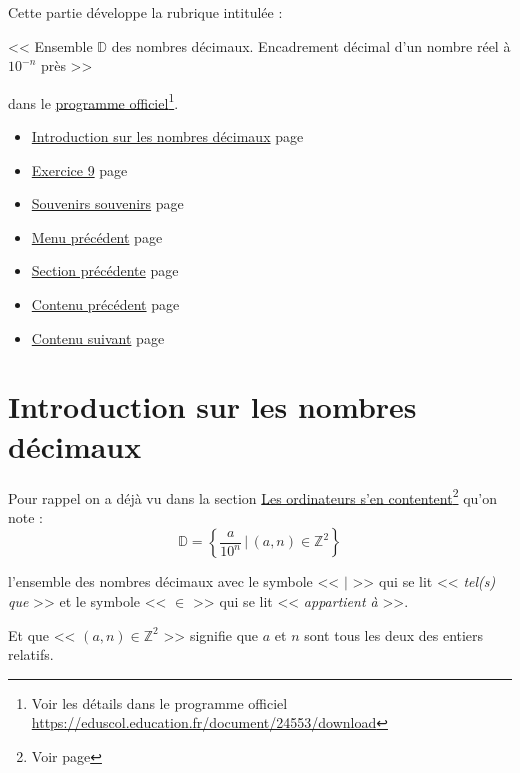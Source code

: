 \documentclass[a4paper,11pt]{book}
\begin{document}
\clearpage

Cette partie développe la rubrique intitulée :

<< Ensemble \(\mathbb{D}\) des nombres décimaux.
Encadrement décimal d'un nombre réel à \(10^{-n}\) près >>

dans le \href{https://eduscol.education.fr/document/24553/download}{programme officiel}\footnote{Voir les détails dans le programme officiel
\url{https://eduscol.education.fr/document/24553/download}}.
\clearpage


\label{orgdd2209a}
\label{page:content5-menu}
\begin{itemize}
\item \hyperref[org004baf8]{Introduction sur les nombres décimaux} page \pageref{page:sec2.5.1intro-dec}
\item \hyperref[org3125f8c]{Exercice 9} page \pageref{page:sec2.5.2exo9}
\item \hyperref[org2d0b4af]{Souvenirs souvenirs} page \pageref{page:sec2.5.3souv}
\item \hyperref[org2ce8f1f]{Menu précédent} page \pageref{page:content-menu}
\item \hyperref[org71eb39f]{Section précédente} page \pageref{page:sec2.4.5exo8}
\item \hyperref[orgbdb89e7]{Contenu précédent} page \pageref{page:sec2.4content4}
\item \hyperref[orgee452f1]{Contenu suivant} page \pageref{page:sec2.6content6}
\end{itemize}




\clearpage

\section{Introduction sur les nombres décimaux}
\label{sec:orge300399}
\label{org004baf8}
\label{page:sec2.5.1intro-dec}

Pour rappel on a déjà vu dans la section \hyperref[org1213e07]{Les ordinateurs s'en
contentent}\footnote{Voir page \pageref{page:sec2.1.3cpu}} qu'on note :
\[\mathbb{D} = \left\{ \dfrac{a}{10^n}\,|\,(a,
n)\in\mathbb{Z}^2\right\}\]

l'ensemble des nombres décimaux avec le
symbole << \(|\) >> qui se lit << \emph{tel(s) que} >> et le symbole <<
\(\in\) >> qui se lit << \emph{appartient à} >>.

Et que << \((a, n)\in\mathbb{Z}^2\) >> signifie que \(a\) et \(n\) sont tous
les deux des entiers relatifs.
\end{document}
